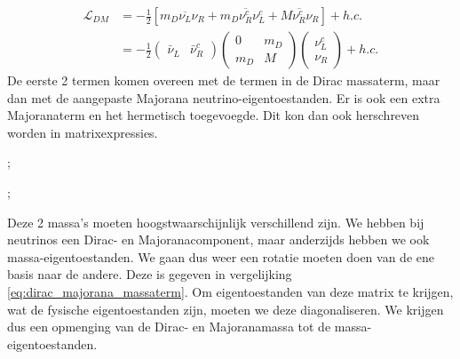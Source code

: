 \documentclass[../main.tex]{subfiles}
\begin{document}
\begin{equation}
    \begin{aligned}
        \label{eq:dirac_majorana_massaterm}
        \mathcal{L}_{D M} &=-\frac{1}{2}\left[m_{D} \overline{\nu_{L}} \nu_{R}+m_{D} \overline{\nu_{R}^{c}} \nu_{L}^{c}+M \overline{\nu_{R}^{c}} \nu_{R}\right]+h . c . \\
                          &=-\frac{1}{2}\left(\begin{array}{cc}
                                  \bar{\nu}_{L} & \bar{\nu}_{R}^{c}
                                  \end{array}\right)\left(\begin{array}{cc}
                                  0 & m_{D} \\
                                  m_{D} & M
                                  \end{array}\right)\left(\begin{array}{c}
                                  \nu_{L}^{c} \\
                                  \nu_{R}
                          \end{array}\right)+h . c .
    \end{aligned}
\end{equation}
De eerste 2 termen komen overeen met de termen in de Dirac massaterm, maar dan met de aangepaste Majorana neutrino-eigentoestanden. Er is ook een extra Majoranaterm en het hermetisch toegevoegde. Dit kon dan ook herschreven worden in matrixexpressies.\\
\begin{minipage}[c]{0.5\textwidth}
    \begin{center}
        ;
    \end{center}
\end{minipage}\noindent
\begin{minipage}[c]{0.5\textwidth}
    \begin{center}
        ;
    \end{center}
\end{minipage}
Deze 2 massa's moeten hoogstwaarschijnlijk verschillend zijn. We hebben bij neutrinos een Dirac- en Majoranacomponent, maar anderzijds hebben we ook massa-eigentoestanden. We gaan dus weer een rotatie moeten doen van de ene basis naar de andere. Deze is gegeven in vergelijking \ref{eq:dirac_majorana_massaterm}. Om eigentoestanden van deze matrix te krijgen, wat de fysische eigentoestanden zijn, moeten we deze diagonaliseren. We krijgen dus een opmenging van de Dirac- en Majoranamassa tot de massa-eigentoestanden.
\end{document}

